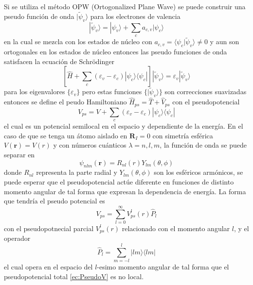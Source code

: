 \documentclass[12pt,a4paper, oneside]{book}
\begin{document}
   Si se utiliza el m\'etodo OPW (Ortogonalized Plane Wave) se puede construir una pseudo funci\'on de onda $|\tilde{\psi}_v \rangle $ para los electrones de valencia
   \begin{equation*}
   |\tilde{\psi}_v \rangle = | \psi_v \rangle + \sum_c a_{c,v} |\psi_c \rangle
   \end{equation*}
   en la cual se mezcla con los estados de n\'ucleo con $a_{c,v} = \langle \psi_c | \tilde{\psi}_v \rangle \not = 0$ y aun son ortogonales en los estados de n\'ucleo entonces las pseudo funciones de onda satisfacen la ecuaci\'on de  Schr\"odinger
   \begin{equation*}
   \left[\hat{H} + \sum_{c} (\varepsilon_v - \varepsilon_c) |\psi_c \rangle \langle \psi_c |\right] |\tilde{\psi}_v \rangle = \varepsilon_v | \tilde{\psi}_v \rangle
   \end{equation*}
   para los eigenvalores $\{ \varepsilon_v \}$ pero estas funciones $ \{| \tilde{\psi}_v \rangle \}$ son correcciones suavizadas entonces se define el peudo Hamiltoniano $\hat{H}_{ps} = \hat{T} + \hat{V}_{ps}$ con el pseudopotencial
   \begin{equation*}
   V_{ps}= V+ \sum_{c} (\varepsilon_v - \varepsilon_c) |\psi_c \rangle \langle \psi_c |
   \end{equation*}
   el cual es un potencial semilocal en el espacio y dependiente de la energ\'ia.
   \newline
   En el caso de que se tenga un \'atomo aislado en $\pmb{R}_I = 0$ con simetr\'ia esf\'erica $V(\pmb{r}) = V(r)$ y con n\'umeros cu\'anticos $\lambda= n,l,m $, la funci\'on de onda se puede separar en
   \begin{equation}
   \psi_{nlm} (\pmb{r}) = R_{nl} (r) Y_{lm} (\theta, \phi) \label{ec:Psudofunc}
   \end{equation}
   donde $R_{nl}$ representa la parte radial y $Y_{lm} (\theta, \phi) $ son los esf\'ericos arm\'onicos, se puede esperar que el pseudopotencial act\'ue diferente en funciones de distinto momento angular de tal forma que expresan la dependencia de energ\'ia. La forma que tendr\'ia el pseudo potencial es
   \begin{equation}
   V_{ps} = \sum_{l=0}^{\infty} V_{ps}^l (r) \hat{P}_l \label{ec:PseudoV}
   \end{equation} 
   con el pseudopotnecial parcial $V_{ps}^l (r) $ relacionado con el momento angular $l$, y el operador
   \begin{equation}
   \hat{P}_l = \sum_{m=-l}^{l} |lm \rangle \langle lm | \label{ec:psudoProj}
   \end{equation}
   el cual opera en el espacio del $l$-esimo momento angular de tal forma que el pseudopotencial total \ref{ec:PseudoV} es no local.
\end{document}
